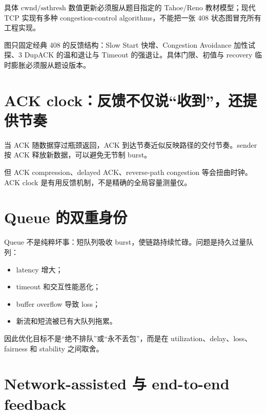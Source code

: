 \documentclass[UTF8,fontset=none,11pt,a4paper]{ctexart}
\providecommand{\tightlist}{\setlength{\itemsep}{0pt}\setlength{\parskip}{0pt}}
\begin{document}
具体 \(\text{cwnd}/\text{ssthresh}\) 数值更新必须服从题目指定的
Tahoe/Reno 教材模型；现代 TCP 实现有多种 congestion-control
algorithms，不能把一张 408 状态图冒充所有工程实现。

\begin{center}
\resizebox{0.96\linewidth}{!}{}
\end{center}
图只固定经典 408 的反馈结构：Slow Start 快增、Congestion Avoidance 加性试探、3 DupACK 的温和退让与 Timeout 的强退让。具体门限、初值与 recovery 临时膨胀必须服从题设版本。

\section{ACK
clock：反馈不仅说``收到''，还提供节奏}\label{8-ack-clockux53cdux9988ux4e0dux4ec5ux8bf4ux6536ux5230ux8fd8ux63d0ux4f9bux8282ux594f}

当 ACK 随数据穿过瓶颈返回，ACK 到达节奏近似反映路径的交付节奏。sender 按
ACK 释放新数据，可以避免无节制 burst。

但 ACK compression、delayed ACK、reverse-path congestion
等会扭曲时钟。ACK clock 是有用反馈机制，不是精确的全局容量测量仪。

\section{Queue
的双重身份}\label{9-queue-ux7684ux53ccux91cdux8eabux4efd}

Queue 不是纯粹坏事：短队列吸收
burst，使链路持续忙碌。问题是持久过量队列：

\begin{itemize}
\tightlist
\item
  latency 增大；
\item
  timeout 和交互性能恶化；
\item
  buffer overflow 导致 loss；
\item
  新流和短流被已有大队列拖累。
\end{itemize}

因此优化目标不是``绝不排队''或``永不丢包''，而是在
utilization、delay、loss、fairness 和 stability 之间取舍。

\section{Network-assisted 与 end-to-end
feedback}\label{10-network-assisted-ux4e0e-end-to-end-feedback}
\end{document}
